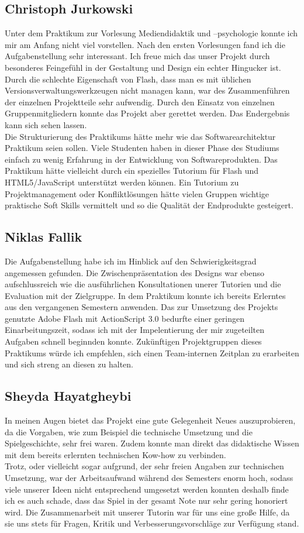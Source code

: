 \documentclass[a4paper, 11pt]{article} %
\begin{document}
\subsection{Christoph Jurkowski}
Unter dem Praktikum zur Vorlesung Mediendidaktik und –psychologie konnte ich mir am Anfang nicht viel vorstellen. Nach den ersten Vorlesungen fand ich die Aufgabenstellung sehr interessant. Ich freue mich das unser Projekt durch besonderes Feingefühl in der Gestaltung und Design ein echter Hingucker ist. Durch die schlechte Eigenschaft von Flash, dass man es mit üblichen Versionsverwaltungswerkzeugen nicht managen kann, war des Zusammenführen der einzelnen Projektteile sehr aufwendig. Durch den Einsatz von einzelnen Gruppenmitgliedern konnte das Projekt aber gerettet werden. Das Endergebnis kann sich sehen lassen. \\
Die Strukturierung des Praktikums hätte mehr wie das Softwarearchitektur Praktikum seien sollen. Viele Studenten haben in dieser Phase des Studiums einfach zu wenig Erfahrung in der Entwicklung von Softwareprodukten. Das Praktikum hätte vielleicht durch ein spezielles Tutorium für Flash und HTML5/JavaScript unterstützt werden können. Ein Tutorium zu Projektmanagement oder Konfliktlösungen hätte vielen Gruppen wichtige praktische Soft Skills vermittelt und so die Qualität der Endprodukte gesteigert.


\subsection{Niklas Fallik}
Die Aufgabenstellung habe ich im Hinblick auf den Schwierigkeitsgrad angemessen gefunden.
Die Zwischenpräsentation des Designs war ebenso aufschlussreich wie die ausführlichen Konsultationen unerer Tutorien und die Evaluation mit der Zielgruppe.
In dem Praktikum konnte ich bereits Erlerntes aus den vergangenen Semestern anwenden.
Das zur Umsetzung des Projekts genutzte Adobe Flash mit ActionScript 3.0 bedurfte einer geringen Einarbeitungszeit, sodass ich mit der Impelentierung der mir zugeteilten Aufgaben schnell beginnden konnte.
Zukünftigen Projektgruppen dieses Praktikums würde ich empfehlen, sich einen Team-internen Zeitplan zu erarbeiten und sich streng an diesen zu halten.

\subsection{Sheyda Hayatgheybi}
In meinen Augen bietet das Projekt eine gute Gelegenheit Neues auszuprobieren, da die Vorgaben, wie zum Beispiel die technische Umsetzung und die Spielgeschichte, sehr frei waren. Zudem konnte man direkt das didaktische Wissen mit dem bereits erlernten technischen Kow-how zu verbinden. \\
Trotz, oder vielleicht sogar aufgrund, der sehr freien Angaben zur technischen Umsetzung, war der Arbeitsaufwand während des Semesters enorm hoch, sodass viele unserer Ideen nicht entsprechend umgesetzt werden konnten deshalb finde ich es auch schade, dass das Spiel in der gesamt Note nur sehr gering honoriert wird. 
Die Zusammenarbeit mit unserer Tutorin war für uns eine große Hilfe, da sie uns stets für Fragen, Kritik und Verbesserungsvorschläge zur Verfügung stand.


\end{document}
